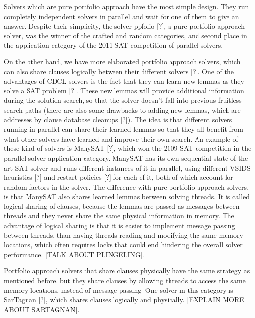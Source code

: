 \documentclass{llncs}
\begin{document}
Solvers which are pure portfolio approach have the most simple design. They run completely independent solvers in parallel and wait for one of them to give an answer. Despite their simplicity, the solver ppfolio [?], a pure portfolio approach solver, was the winner of the crafted and random categories, and second place in the application category of the 2011 SAT competition of parallel solvers. 

On the other hand, we have more elaborated portfolio approach solvers, which can also share clauses logically between their different solvers [?]. One of the advantages of CDCL solvers is the fact that they can learn new lemmas as they solve a SAT problem [?]. These new lemmas will provide additional information during the solution search, so that the solver doesn't fall into previous fruitless search paths (there are also some drawbacks to adding new lemmas, which are addresses by clause database cleanups [?]). The idea is that different solvers running in parallel can share their learned lemmas so that they all benefit from what other solvers have learned and improve their own search. An example of these kind of solvers is ManySAT [?], which won the 2009 SAT competition in the parallel solver application category. ManySAT has its own sequential state-of-the-art SAT solver and runs different instances of it in parallel, using different VSIDS heuristics [?] and restart policies [?] for each of it, both of which account for random factors in the solver. The difference with pure portfolio approach solvers, is that ManySAT also shares learned lemmas between solving threads. It is called logical sharing of clauses, because the lemmas are passed as messages between threads and they never share the same physical information in memory. The advantage of logical sharing is that it is easier to implement message passing between threads, than having threads reading and modifying the same memory locations, which often requires locks that could end hindering the overall solver performance. [TALK ABOUT PLINGELING].

Portfolio approach solvers that share clauses physically have the same strategy as mentioned before, but they share clauses by allowing threads to access the same memory locations, instead of message passing. One solver in this category is SarTagnan [?], which shares clauses logically and physically. [EXPLAIN MORE ABOUT SARTAGNAN]. 
\end{document}
